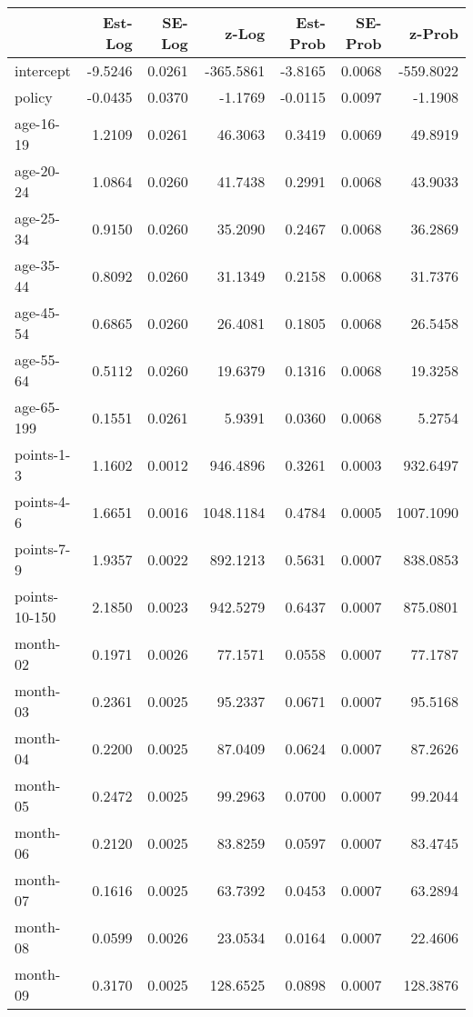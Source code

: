 \documentclass[10pt]{article}
\begin{document}
\begin{table}[ht]
\centering
\begin{tabular}{lrrrrrr}
  \hline
 & Est-Log & SE-Log & z-Log & Est-Prob & SE-Prob & z-Prob \\ 
  \hline
intercept & -9.5246 & 0.0261 & -365.5861 & -3.8165 & 0.0068 & -559.8022 \\ 
  policy & -0.0435 & 0.0370 & -1.1769 & -0.0115 & 0.0097 & -1.1908 \\ 
  age-16-19 & 1.2109 & 0.0261 & 46.3063 & 0.3419 & 0.0069 & 49.8919 \\ 
  age-20-24 & 1.0864 & 0.0260 & 41.7438 & 0.2991 & 0.0068 & 43.9033 \\ 
  age-25-34 & 0.9150 & 0.0260 & 35.2090 & 0.2467 & 0.0068 & 36.2869 \\ 
  age-35-44 & 0.8092 & 0.0260 & 31.1349 & 0.2158 & 0.0068 & 31.7376 \\ 
  age-45-54 & 0.6865 & 0.0260 & 26.4081 & 0.1805 & 0.0068 & 26.5458 \\ 
  age-55-64 & 0.5112 & 0.0260 & 19.6379 & 0.1316 & 0.0068 & 19.3258 \\ 
  age-65-199 & 0.1551 & 0.0261 & 5.9391 & 0.0360 & 0.0068 & 5.2754 \\ 
  points-1-3 & 1.1602 & 0.0012 & 946.4896 & 0.3261 & 0.0003 & 932.6497 \\ 
  points-4-6 & 1.6651 & 0.0016 & 1048.1184 & 0.4784 & 0.0005 & 1007.1090 \\ 
  points-7-9 & 1.9357 & 0.0022 & 892.1213 & 0.5631 & 0.0007 & 838.0853 \\ 
  points-10-150 & 2.1850 & 0.0023 & 942.5279 & 0.6437 & 0.0007 & 875.0801 \\ 
  month-02 & 0.1971 & 0.0026 & 77.1571 & 0.0558 & 0.0007 & 77.1787 \\ 
  month-03 & 0.2361 & 0.0025 & 95.2337 & 0.0671 & 0.0007 & 95.5168 \\ 
  month-04 & 0.2200 & 0.0025 & 87.0409 & 0.0624 & 0.0007 & 87.2626 \\ 
  month-05 & 0.2472 & 0.0025 & 99.2963 & 0.0700 & 0.0007 & 99.2044 \\ 
  month-06 & 0.2120 & 0.0025 & 83.8259 & 0.0597 & 0.0007 & 83.4745 \\ 
  month-07 & 0.1616 & 0.0025 & 63.7392 & 0.0453 & 0.0007 & 63.2894 \\ 
  month-08 & 0.0599 & 0.0026 & 23.0534 & 0.0164 & 0.0007 & 22.4606 \\ 
  month-09 & 0.3170 & 0.0025 & 128.6525 & 0.0898 & 0.0007 & 128.3876 \\ 

\end{tabular}
\end{table}
\end{document}
